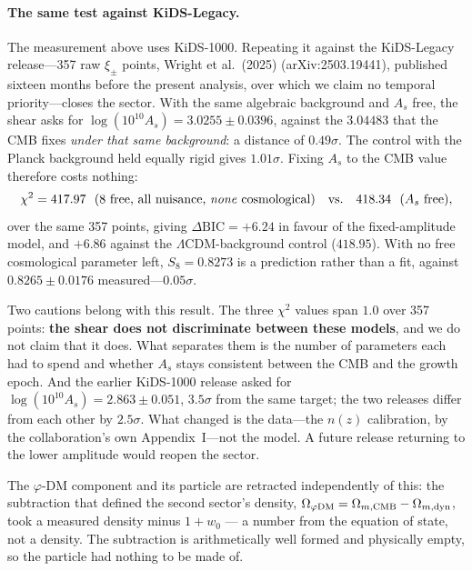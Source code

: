 \documentclass[aps,prd,preprint,amsmath,amssymb,nofootinbib,longbibliography]{revtex4-2}
\begin{document}
\paragraph{The same test against KiDS-Legacy.}
The measurement above uses KiDS-1000.  Repeating it against the KiDS-Legacy
release---357 raw $\xi_\pm$ points, Wright et al.\ (2025) (arXiv:2503.19441),
published sixteen months before the present analysis, over which we claim no
temporal priority---closes the sector.  With the same algebraic background and
$A_s$ free, the shear asks for $\log(10^{10}A_s)=3.0255\pm0.0396$, against the
$3.04483$ that the CMB fixes \emph{under that same background}: a distance of
$0.49\sigma$.  The control with the Planck background held equally rigid gives
$1.01\sigma$.  Fixing $A_s$ to the CMB value therefore costs nothing:
\begin{equation}
  \chi^2 = 417.97 \ \ (\text{8 free, all nuisance, \emph{none} cosmological})
  \quad\text{vs.}\quad
  418.34 \ \ (A_s \text{ free}),
\end{equation}
over the same 357 points, giving $\Delta\mathrm{BIC}=+6.24$ in favour of the
fixed-amplitude model, and $+6.86$ against the $\Lambda$CDM-background control
($418.95$).  With no free cosmological parameter left, $S_8=0.8273$ is a
prediction rather than a fit, against $0.8265\pm0.0176$ measured---$0.05\sigma$.

Two cautions belong with this result.  The three $\chi^2$ values span $1.0$
over 357 points: \textbf{the shear does not discriminate between these
models}, and we do not claim that it does.  What separates them is the number
of parameters each had to spend and whether $A_s$ stays consistent between the
CMB and the growth epoch.  And the earlier KiDS-1000 release asked for
$\log(10^{10}A_s)=2.863\pm0.051$, $3.5\sigma$ from the same target; the two
releases differ from each other by $2.5\sigma$.  What changed is the data---the
$n(z)$ calibration, by the collaboration's own Appendix~I---not the model.  A
future release returning to the lower amplitude would reopen the sector.

The $\varphi$-DM component and its particle are retracted independently of
this: the subtraction that defined the second sector's density,
$\Omega_{\varphi\rm DM}=\Omega_{m,\rm CMB}-\Omega_{m,\rm dyn}$, took a measured
density minus $1+w_0$ --- a number from the equation of state, not a density.
The subtraction is arithmetically well formed and physically empty, so the
particle had nothing to be made of.
\end{document}
